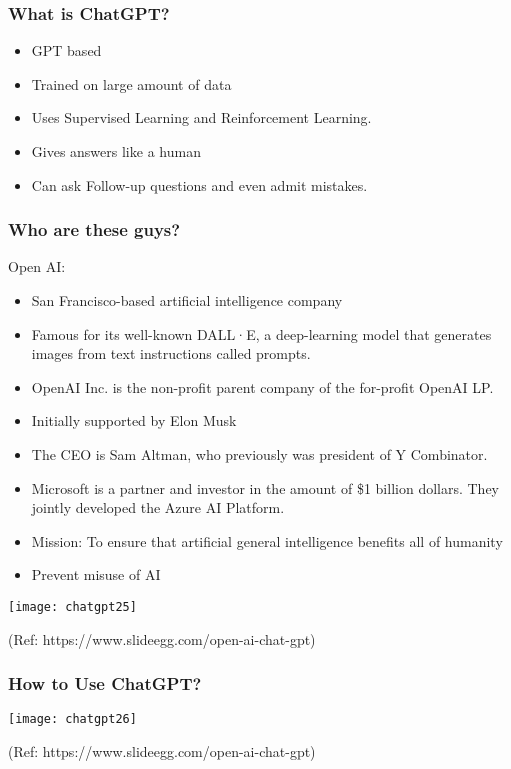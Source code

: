 \begin{frame}[fragile]\frametitle{What is ChatGPT?}


\begin{itemize}
\item GPT based
\item Trained on large amount of data
\item Uses Supervised Learning and Reinforcement Learning.
\item Gives answers like a human
\item Can ask Follow-up questions and even admit mistakes.
\end{itemize}	 

\end{frame}


\begin{frame}[fragile]\frametitle{Who are these guys?}

Open AI:
\begin{itemize}
\item San Francisco-based artificial intelligence company
\item Famous for its well-known DALL·E, a deep-learning model that generates images from text instructions called prompts.
\item OpenAI Inc. is the non-profit parent company of the for-profit OpenAI LP.
\item Initially supported by Elon Musk
\item The CEO is Sam Altman, who previously was president of Y Combinator.
\item Microsoft is a partner and investor in the amount of \$1 billion dollars. They jointly developed the Azure AI Platform.
\item Mission: To ensure that artificial general intelligence benefits all of humanity
\item Prevent misuse of AI
\end{itemize}	 

\begin{center}
\texttt{[image: chatgpt25]}
\end{center}				
{\tiny (Ref: https://www.slideegg.com/open-ai-chat-gpt)}


\end{frame}

\begin{frame}[fragile]\frametitle{How to Use ChatGPT?}


\begin{center}
\texttt{[image: chatgpt26]}
\end{center}				
{\tiny (Ref: https://www.slideegg.com/open-ai-chat-gpt)}


\end{frame}


